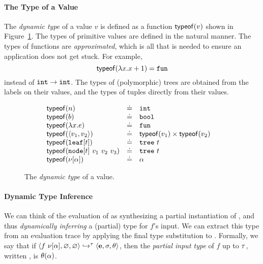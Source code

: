 \paragraph{The Type of a Value} The \emph{dynamic type}
of a value $v$ is defined as a function $\mathsf{typeof}(v)$ shown
in Figure~\ref{fig:typeof}.
%
The types of primitive values are defined in the natural manner.
%
The types of functions are \emph{approximated}, which is all
that is needed to ensure an application does not get stuck.
%
For example,
$$\mathsf{typeof}(\lambda x. x + 1) = \mathtt{fun}$$
instead of $\mathtt{int} \rightarrow \mathtt{int}$.
%
The types of (polymorphic) trees are obtained from the labels on their
values, and the types of tuples directly from their values.

\begin{figure}[ht]
\[ \begin{array}{lcll}
    \mathsf{typeof}(n)   & \doteq & \mathtt{int} & \\
    \mathsf{typeof}(b)   & \doteq & \mathtt{bool} & \\
    \mathsf{typeof}(\lambda x. e) & \doteq & \mathtt{fun} \\
    \mathsf{typeof}(\langle v_1, v_2 \rangle) & \doteq & \mathsf{typeof}(v_1) \times \mathsf{typeof}(v_2) \\
    \mathsf{typeof}(\mathtt{leaf}[t]) & \doteq & \mathtt{tree}\ t \\
    \mathsf{typeof}(\mathtt{node}[t]\ v_1\ v_2\ v_3) & \doteq & \mathtt{tree}\ t \\
    \mathsf{typeof}(\nu[\alpha]) & \doteq & \alpha \\
  \end{array} \]
\caption{The \emph{dynamic type} of a value.}
\label{fig:typeof}
\end{figure}

\paragraph{Dynamic Type Inference}
We can think of the evaluation of 
as synthesizing a partial instantiation of \thole, and thus
\emph{dynamically inferring} a (partial) type for $f$'s input.
%
We can extract this type from an evaluation trace by
applying the final type substitution to \thole.
%
Formally, we say that if
$\langle f\ \nu[\alpha], \varnothing, \varnothing \rangle \hookrightarrow^{\tau} \langle \mathbf{e}, \sigma, \theta \rangle$,
then the \emph{partial input type} of $f$ up to $\tau$, written
, is $\theta(\alpha)$.

